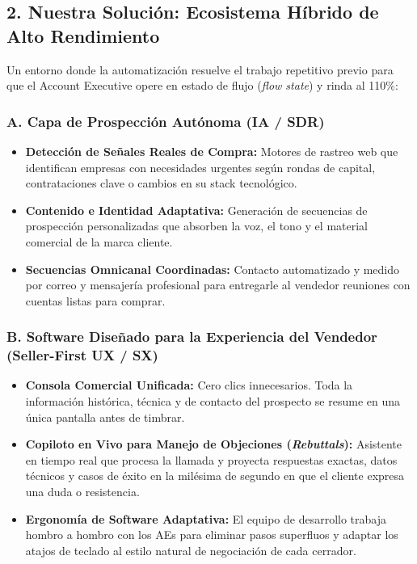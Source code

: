\documentclass[12pt,letterpaper]{article}
\begin{document}
\subsection*{2. Nuestra Solución: Ecosistema Híbrido de Alto Rendimiento}
Un entorno donde la automatización resuelve el trabajo repetitivo previo para que el Account Executive opere en estado de flujo (\textit{flow state}) y rinda al 110\%:

\subsubsection*{A. Capa de Prospección Autónoma (IA / SDR)}
\begin{itemize}
    \item \textbf{Detección de Señales Reales de Compra:} Motores de rastreo web que identifican empresas con necesidades urgentes según rondas de capital, contrataciones clave o cambios en su stack tecnológico.
    \item \textbf{Contenido e Identidad Adaptativa:} Generación de secuencias de prospección personalizadas que absorben la voz, el tono y el material comercial de la marca cliente.
    \item \textbf{Secuencias Omnicanal Coordinadas:} Contacto automatizado y medido por correo y mensajería profesional para entregarle al vendedor reuniones con cuentas listas para comprar.
\end{itemize}

\subsubsection*{B. Software Diseñado para la Experiencia del Vendedor (Seller-First UX / SX)}
\begin{itemize}
    \item \textbf{Consola Comercial Unificada:} Cero clics innecesarios. Toda la información histórica, técnica y de contacto del prospecto se resume en una única pantalla antes de timbrar.
    \item \textbf{Copiloto en Vivo para Manejo de Objeciones (\textit{Rebuttals}):} Asistente en tiempo real que procesa la llamada y proyecta respuestas exactas, datos técnicos y casos de éxito en la milésima de segundo en que el cliente expresa una duda o resistencia.
    \item \textbf{Ergonomía de Software Adaptativa:} El equipo de desarrollo trabaja hombro a hombro con los AEs para eliminar pasos superfluos y adaptar los atajos de teclado al estilo natural de negociación de cada cerrador.
\end{itemize}
\end{document}
